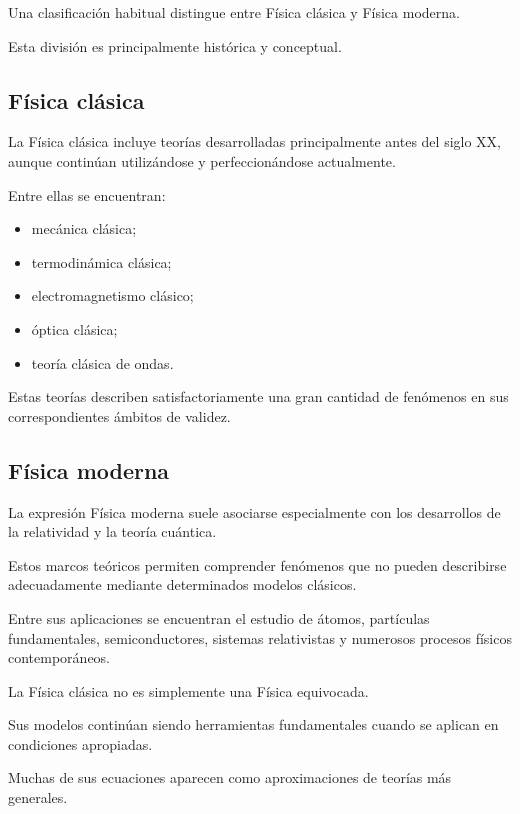 Una clasificación habitual distingue
entre Física clásica y Física moderna.

Esta división es principalmente histórica
y conceptual.

\subsection{Física clásica}

La Física clásica incluye teorías desarrolladas
principalmente antes del siglo XX,
aunque continúan utilizándose
y perfeccionándose actualmente.

Entre ellas se encuentran:

\begin{itemize}
    \item mecánica clásica;
    \item termodinámica clásica;
    \item electromagnetismo clásico;
    \item óptica clásica;
    \item teoría clásica de ondas.
\end{itemize}

Estas teorías describen satisfactoriamente
una gran cantidad de fenómenos
en sus correspondientes ámbitos de validez.

\subsection{Física moderna}

La expresión Física moderna suele asociarse
especialmente con los desarrollos
de la relatividad y la teoría cuántica.

Estos marcos teóricos permiten comprender
fenómenos que no pueden describirse
adecuadamente mediante determinados
modelos clásicos.

Entre sus aplicaciones se encuentran
el estudio de átomos, partículas fundamentales,
semiconductores, sistemas relativistas
y numerosos procesos físicos contemporáneos.

\begin{observacion}

La Física clásica no es simplemente
una Física equivocada.

Sus modelos continúan siendo herramientas
fundamentales cuando se aplican
en condiciones apropiadas.

Muchas de sus ecuaciones aparecen
como aproximaciones de teorías más generales.

\end{observacion}


